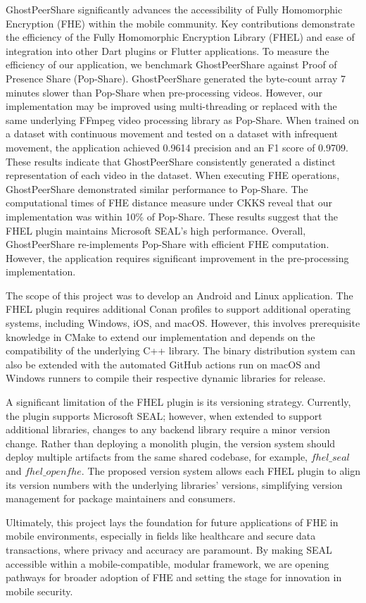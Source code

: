 GhostPeerShare significantly advances the accessibility of Fully Homomorphic Encryption (FHE) within the mobile community. Key contributions demonstrate the efficiency of the Fully Homomorphic Encryption Library (FHEL) and ease of integration into other Dart plugins or Flutter applications.
To measure the efficiency of our application, we benchmark GhostPeerShare against Proof of Presence Share (Pop-Share).
GhostPeerShare generated the byte-count array 7 minutes slower than Pop-Share when pre-processing videos. However, our implementation may be improved using multi-threading or replaced with the same underlying FFmpeg video processing library as Pop-Share.
When trained on a dataset with continuous movement and tested on a dataset with infrequent movement, the application achieved 0.9614 precision and an F1 score of 0.9709. These results indicate that GhostPeerShare consistently generated a distinct representation of each video in the dataset.
When executing FHE operations, GhostPeerShare demonstrated similar performance to Pop-Share. The computational times of FHE distance measure under CKKS reveal that our implementation was within 10\% of Pop-Share. These results suggest that the FHEL plugin maintains Microsoft SEAL's high performance.
Overall, GhostPeerShare re-implements Pop-Share with efficient FHE computation. However, the application requires significant improvement in the pre-processing implementation.

The scope of this project was to develop an Android and Linux application. The FHEL plugin requires additional Conan profiles to support additional operating systems, including Windows, iOS, and macOS. However, this involves prerequisite knowledge in CMake to extend our implementation and depends on the compatibility of the underlying C++ library. The binary distribution system can also be extended with the automated GitHub actions run on macOS and Windows runners to compile their respective dynamic libraries for release. 

A significant limitation of the FHEL plugin is its versioning strategy. Currently, the plugin supports Microsoft SEAL; however, when extended to support additional libraries, changes to any backend library require a minor version change. Rather than deploying a monolith plugin, the version system should deploy multiple artifacts from the same shared codebase, for example, $fhel\_seal$ and $fhel\_openfhe$. The proposed version system allows each FHEL plugin to align its version numbers with the underlying libraries' versions, simplifying version management for package maintainers and consumers.

Ultimately, this project lays the foundation for future applications of FHE in mobile environments, especially in fields like healthcare and secure data transactions, where privacy and accuracy are paramount. By making SEAL accessible within a mobile-compatible, modular framework, we are opening pathways for broader adoption of FHE and setting the stage for innovation in mobile security.
